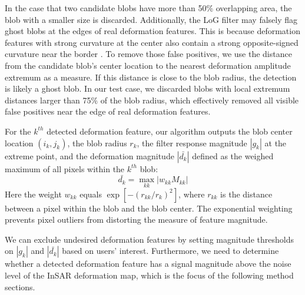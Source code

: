 In the case that two candidate blobs have more than 50\% overlapping area, the blob with a smaller size is discarded. 
Additionally, the LoG filter may falsely flag ghost blobs at the edges of real deformation features. This is because deformation features with strong curvature at the center also contain a strong opposite-signed curvature near the border \citep{Lindeberg1998FeatureDetectionAutomatic}. To remove those false positives, we use the distance from the candidate blob's center location to the nearest deformation amplitude extremum as a measure. If this distance is close to the blob radius, the detection is likely a ghost blob. In our test case, we discarded blobs with local extremum distances larger than 75$\%$ of the blob radius, which effectively removed all visible false positives near the edge of real deformation features.

For the $k^{th}$ detected deformation feature, our algorithm outputs the blob center location $(i_k, j_k)$, the blob radius $ r_k$, the filter response magnitude $|g_k|$ at the extreme point, and the deformation magnitude $|\bar{d_k}|$ defined as the weighed maximum of all pixels within the $k^{th}$ blob:
\begin{equation}
	\bar{d_k} = \max_{kk} |w_{kk} M_{kk} | 
\end{equation}
Here the weight $w_{kk}$ equals $\exp\left[-(r_{kk} / r_k)^2\right]$, where $r_{kk}$ is the distance between a pixel within the blob and the blob center. The exponential weighting prevents pixel outliers from distorting the measure of feature magnitude. 

We can exclude undesired deformation features by setting magnitude thresholds on $|g_k|$ and $|\bar{d_k}|$ based on users' interest. Furthermore, we need to determine whether a detected deformation feature has a signal magnitude above the noise level of the InSAR deformation map, which is the focus of the following method sections. 


